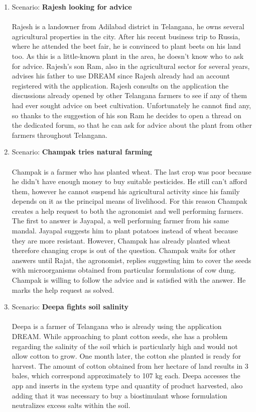 \begin{enumerate}
\item Scenario: \textbf{Rajesh looking for advice}\\\\
Rajesh is a landowner from Adilabad district in Telangana, he owns several agricultural properties in the city. After his recent business trip to Russia, where he attended the beet fair, he is convinced to plant beets on his land too. As this is a little-known plant in the area, he doesn't know who to ask for advice. Rajesh's son Ram, also in the agricultural sector for several years, advises his father to use DREAM since Rajesh already had an account registered with the application.
Rajesh consults on the application the discussions already opened by other Telangana farmers to see if any of them had ever sought advice on beet cultivation. Unfortunately he cannot find any, so thanks to the suggestion of his son Ram he decides to open a thread on the dedicated forum, so that he can ask for advice about the plant from other farmers throughout Telangana.\\

\item Scenario: \textbf{Champak tries natural farming}\\\\
Champak is a farmer who has planted wheat. The last crop was poor because he didn't have enough money to buy suitable pesticides. He still can't afford them, however he cannot suspend his agricultural activity since his family depends on it as the principal means of livelihood. For this reason Champak creates a help request to both the agronomist and well performing farmers. The first to answer is Jayapal, a well performing farmer from his same mandal. Jayapal suggests him to plant potatoes instead of wheat because they are more resistant. However, Champak has already planted wheat therefore changing crops is out of the question. Champak waits for other answers until Rajat, the agronomist, replies suggesting him to cover the seeds with microorganisms obtained from particular formulations of cow dung. Champak is willing to follow the advice and is satisfied with the answer. He marks the help request as solved. 
\\

\item Scenario: \textbf{Deepa fights soil salinity}\\\\
Deepa is a farmer of Telangana who is already using the application DREAM. While approaching to plant cotton seeds, she has a problem regarding the salinity of the soil which is particularly high and would not allow cotton to grow. One month later, the cotton she planted is ready for harvest. The amount of cotton obtained from her hectare of land results in 3 bales, which correspond approximately to 107 kg each. Deepa accesses the app and inserts in the system type and quantity of product harvested, also adding that it was necessary to buy a biostimulant whose formulation neutralizes excess salts within the soil.\\


\end{enumerate}
